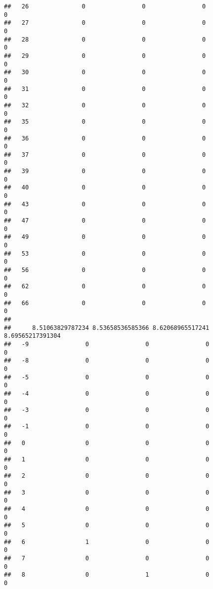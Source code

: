 \documentclass[]{article}
\begin{document}
\begin{verbatim}
##   26               0                0                0                0
##   27               0                0                0                0
##   28               0                0                0                0
##   29               0                0                0                0
##   30               0                0                0                0
##   31               0                0                0                0
##   32               0                0                0                0
##   35               0                0                0                0
##   36               0                0                0                0
##   37               0                0                0                0
##   39               0                0                0                0
##   40               0                0                0                0
##   43               0                0                0                0
##   47               0                0                0                0
##   49               0                0                0                0
##   53               0                0                0                0
##   56               0                0                0                0
##   62               0                0                0                0
##   66               0                0                0                0
##     
##      8.51063829787234 8.53658536585366 8.62068965517241 8.69565217391304
##   -9                0                0                0                0
##   -8                0                0                0                0
##   -5                0                0                0                0
##   -4                0                0                0                0
##   -3                0                0                0                0
##   -1                0                0                0                0
##   0                 0                0                0                0
##   1                 0                0                0                0
##   2                 0                0                0                0
##   3                 0                0                0                0
##   4                 0                0                0                0
##   5                 0                0                0                0
##   6                 1                0                0                0
##   7                 0                0                0                0
##   8                 0                1                0                0

\end{verbatim}
\end{document}
